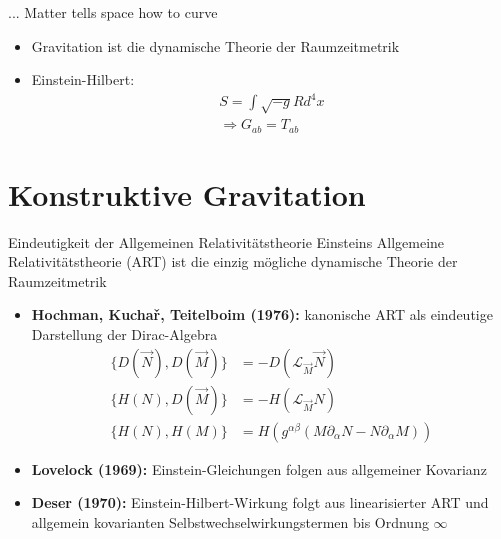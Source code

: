 \documentclass{beamer}
\begin{document}
    \begin{frame}{... Matter tells space how to curve}
        \begin{itemize}
            \item Gravitation ist die dynamische Theorie der Raumzeitmetrik \pause
            \item Einstein-Hilbert:
            \begin{gather*}
                S = \int \sqrt{-g} R d^4 x \\
                \Rightarrow G_{ab} = T_{ab}
            \end{gather*}
        \end{itemize}
    \end{frame}


    \section{Konstruktive Gravitation}\label{sec:constructive-gravity}

    \begin{frame}{Eindeutigkeit der Allgemeinen Relativitätstheorie}
        Einsteins Allgemeine Relativitätstheorie (ART) ist die einzig mögliche dynamische Theorie
        der Raumzeitmetrik \pause
        \begin{itemize}
            \setlength{\belowdisplayskip}{-10pt}
            \item \textbf{Hochman, Kuchař, Teitelboim (1976):} kanonische ART als eindeutige Darstellung der Dirac-Algebra
            \begin{align*}
                \{ D(\vec N), D(\vec M) \} &= -D(\mathcal L_{\vec M} \vec N) \\
                \{ H(N), D(\vec M) \} &= -H(\mathcal L_{\vec M} N) \\
                \{ H(N), H(M) \} &= H(g^{\alpha\beta}(M\partial_\alpha N - N\partial_\alpha M))
            \end{align*} \pause
            \item \textbf{Lovelock (1969):} Einstein-Gleichungen folgen aus allgemeiner Kovarianz \pause
            \item \textbf{Deser (1970):} Einstein-Hilbert-Wirkung folgt aus linearisierter ART und allgemein kovarianten
            Selbstwechselwirkungstermen bis Ordnung $\infty$
        \end{itemize}
    \end{frame}
\end{document}
